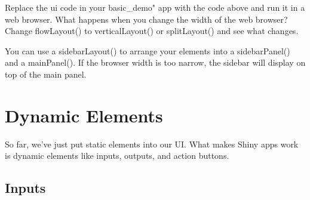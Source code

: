 \documentclass[
]{book}
\newenvironment{Shaded}{\begin{snugshade}}{\end{snugshade}}
\newcommand{\AttributeTok}[1]{\textcolor[rgb]{0.77,0.63,0.00}{#1}}
\newcommand{\FunctionTok}[1]{\textcolor[rgb]{0.00,0.00,0.00}{#1}}
\newcommand{\NormalTok}[1]{#1}
\newcommand{\OtherTok}[1]{\textcolor[rgb]{0.56,0.35,0.01}{#1}}
\newcommand{\SpecialCharTok}[1]{\textcolor[rgb]{0.00,0.00,0.00}{#1}}
\newcommand{\StringTok}[1]{\textcolor[rgb]{0.31,0.60,0.02}{#1}}
\begin{document}
Replace the ui code in your basic\_demo" app with the code above and run it in a web browser. What happens when you change the width of the web browser? Change flowLayout() to verticalLayout() or splitLayout() and see what changes.

You can use a sidebarLayout() to arrange your elements into a sidebarPanel() and a mainPanel(). If the browser width is too narrow, the sidebar will display on top of the main panel.

\begin{Shaded}
\end{Shaded}

\hypertarget{dynamic-elements}{%
\section{Dynamic Elements}\label{dynamic-elements}}

So far, we've just put static elements into our UI. What makes Shiny apps work is dynamic elements like inputs, outputs, and action buttons.

\hypertarget{inputs-intro}{%
\subsection{Inputs}\label{inputs-intro}}
\end{document}
